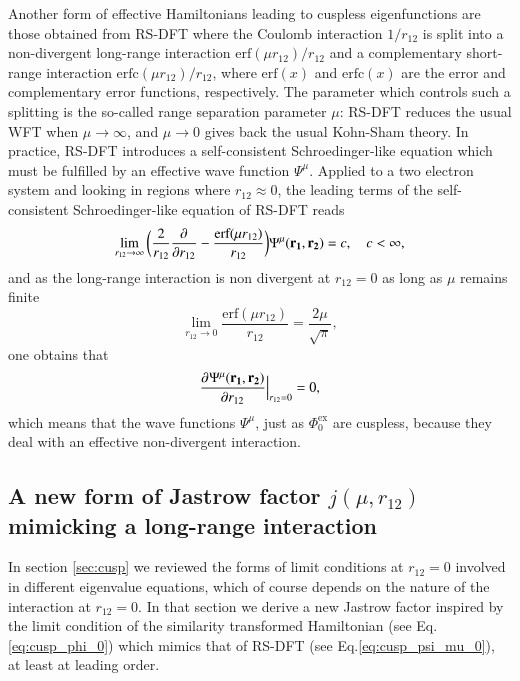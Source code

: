 \documentclass[aip,jcp,reprint,noshowkeys,superscriptaddress]{revtex4-1}
\newcommand{\deriv}[3]{\frac{\partial^{#3} #1}{\partial {#2}^{#3}}}
\newcommand{\bd}[1]{{\bf {#1}}}
\newcommand{\phiex}[0]{\Phi^{\text{ex}}_0}
\begin{document}
Another form of effective Hamiltonians leading to cuspless eigenfunctions are those obtained from RS-DFT 
where the Coulomb interaction $1/r_{12}$ is split into a non-divergent long-range interaction $\text{erf}(\mu r_{12})/r_{12}$ and a complementary short-range interaction $\text{erfc}(\mu r_{12})/r_{12}$, where $\text{erf}(x)$ and $\text{erfc}(x)$ are the error and complementary error functions, respectively. 
The parameter which controls such a splitting is the so-called range separation parameter $\mu$:  RS-DFT reduces the usual WFT when $\mu \rightarrow \infty$, and $\mu \rightarrow 0$ gives back the usual Kohn-Sham theory.  
In practice, RS-DFT introduces a self-consistent Schroedinger-like equation which must be fulfilled by an effective wave function  $\Psi^\mu$.
Applied to a two electron system and looking in regions where $r_{12}\approx 0$, the leading terms of the self-consistent Schroedinger-like equation of RS-DFT reads 
\begin{equation}
 \label{eq:cusp_psi_mu_0}
 \lim_{r_{12}\rightarrow \infty}\bigg( \frac{2}{r_{12}} \deriv{}{r_{12}}{} -\frac{\text{erf}(\mu r_{12})}{r_{12}}\bigg) \Psi^\mu(\bd{r_1},\bd{r_2})  = c,\quad c<\infty,  
\end{equation}
and as the long-range interaction is non divergent at $r_{12}=0$ as long as $\mu$ remains finite 
\begin{equation}
 \lim_{r_{12} \rightarrow 0} \frac{\text{erf}(\mu r_{12})}{r_{12}} = \frac{2 \mu}{\sqrt{\pi}} , 
\end{equation}
one obtains that 
\begin{equation}
 \label{eq:cusp_psi_mu_1}
 \deriv{\Psi^\mu(\bd{r_1},\bd{r_2})}{r_{12}}{}\Bigr|_{r_{12}=0} = 0, 
\end{equation}
which means that the wave functions $\Psi^\mu$, just as $\phiex$ are cuspless, because they deal with an effective non-divergent interaction. 

\subsection{A new form of Jastrow factor $j(\mu,r_{12})$ mimicking a long-range interaction}
In section \ref{sec:cusp} we reviewed the forms of limit conditions at $r_{12}=0$ involved in different eigenvalue equations, which of course depends on the nature of the interaction at $r_{12}=0$. 
In that section we derive a new Jastrow factor inspired by the limit condition of the similarity transformed Hamiltonian (see Eq.\eqref{eq:cusp_phi_0}) which mimics that of RS-DFT (see Eq.\eqref{eq:cusp_psi_mu_0}), at least at leading order. 
\end{document}
